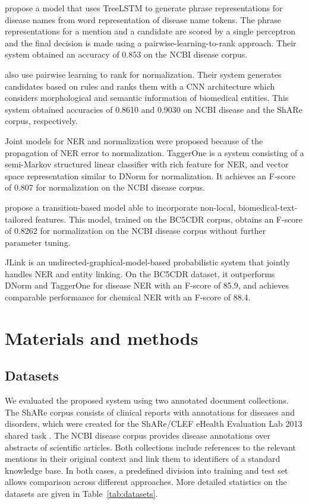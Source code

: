 \documentclass{bioinfo}
\begin{document}
\cite{liu-xu:2018:NLPCC} propose a model that uses TreeLSTM to generate phrase representations for disease names from word representation of disease name tokens.
The phrase representations for a mention and a candidate are scored by a single perceptron and the final decision is made using a pairwise-learning-to-rank approach.
Their system obtained an accuracy of 0.853 on the NCBI disease corpus.  %

\cite{lihaodi-et-al:2017} also use pairwise learning to rank for normalization.
Their system generates candidates based on rules and ranks them with a CNN architecture which considers morphological and semantic information of biomedical entities.
This system obtained accuracies of 0.8610 and 0.9030 on NCBI disease and the ShARe corpus, respectively.



Joint models for NER and normalization were proposed because of the propagation of NER error to normalization.
TaggerOne \citep{leaman-lu:2016} is a system consisting of a semi-Markov structured linear classifier with rich feature for NER, and vector space representation similar to DNorm for normalization.
It achieves an F-score of 0.807 for normalization on the NCBI disease corpus.  %

\cite{lou-et-al:2017} propose a transition-based model able to incorporate non-local, biomedical-text-tailored features.
This model, trained on the BC5CDR corpus, obtains an F-score of 0.8262 for normalization on the NCBI disease corpus without further parameter tuning.

JLink \citep{ter-horst-et-al:2017:LDK} is an undirected-graphical-model-based probabilistic system that jointly handles NER and entity linking.
On the BC5CDR dataset, it outperforms DNorm and TaggerOne for disease NER with an F-score of 85.9, and achieves comparable performance for chemical NER with an F-score of 88.4.



\section{Materials and methods}

\subsection{Datasets}

We evaluated the proposed system using two annotated document collections.
The ShARe corpus consists of clinical reports with annotations for diseases and disorders, which were created for the ShARe/CLEF eHealth Evaluation Lab 2013 shared task \citep{pradhan-et-al:2013:CLEF}.
The NCBI disease corpus \citep{islamaj-dogan-et-al:2014} provides disease annotations over abstracts of scientific articles.
Both collections include references to the relevant mentions in their original context and link them to identifiers of a standard knowledge base.
In both cases, a predefined division into training and test set allows comparison across different approaches.
More detailed statistics on the datasets are given in Table~\ref{tab:datasets}.
\end{document}
